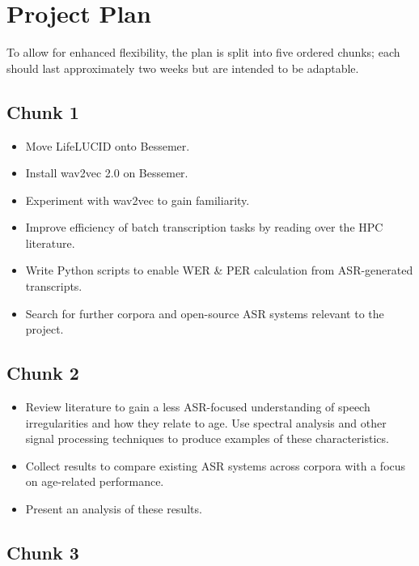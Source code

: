 \section{Project Plan}\label{sec:proj-plan}

To allow for enhanced flexibility, the plan is split into five ordered chunks;
each should last approximately two weeks but are intended to be adaptable.

\subsection{Chunk 1}\label{subsec:wk1}

\begin{itemize}
    \item Move LifeLUCID onto Bessemer.
    \item Install wav2vec 2.0 on Bessemer.
    \item Experiment with wav2vec to gain familiarity.
    \item Improve efficiency of batch transcription tasks by reading over the HPC literature.
    \item Write Python scripts to enable WER \& PER calculation from ASR-generated transcripts.
    \item Search for further corpora and open-source ASR systems relevant to the project.
\end{itemize}

\subsection{Chunk 2}\label{subsec:wk2}

\begin{itemize}
    \item Review literature to gain a less ASR-focused understanding of speech irregularities and
    how they relate to age.
    Use spectral analysis and other signal processing techniques to produce examples of these
    characteristics.
    \item Collect results to compare existing ASR systems across corpora with a focus on
    age-related performance.
    \item Present an analysis of these results.
\end{itemize}

\subsection{Chunk 3}\label{subsec:wk3}

